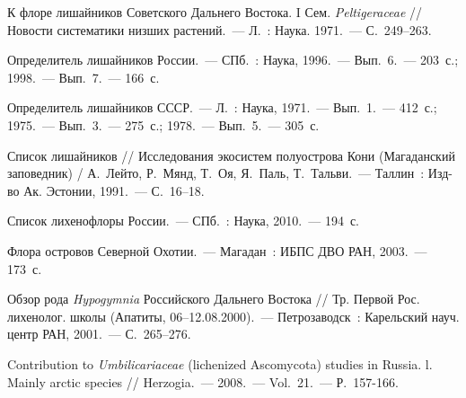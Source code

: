 \begin{thebibliography}{99}
\bibitem{} К флоре лишайников Советского Дальнего Востока. I Сем. \textit{Peltigeraceae} // Новости систематики низших растений.~--- Л.~: Наука. 1971.~--- С.~249--263.

\bibitem{}Определитель лишайников России.~--- СПб.~: Наука, 1996.~--- Вып.~6.~--- 203~с.; 1998.~--- Вып.~7.~--- 166~с.

\bibitem{}Определитель лишайников СССР.~--- Л.~: Наука, 1971.~--- Вып.~1.~--- 412~с.; 1975.~--- Вып.~3.~--- 275~с.; 1978.~--- Вып.~5.~--- 305~с.

\bibitem{} Список лишайников // Исследования экосистем полуострова Кони (Магаданский заповедник) / А.~Лейто, Р.~Мянд, Т.~Оя, Я.~Паль, Т.~Тальви.~--- Таллин~: Изд-во Ак. Эстонии, 1991.~--- С.~16--18.

\bibitem{} Список лихенофлоры России.~--- СПб.~: Наука, 2010.~--- 194~с.

\bibitem{} Флора островов Северной Охотии.~--- Магадан~: ИБПС ДВО РАН, 2003.~--- 173~с.

\bibitem{} Обзор рода \textit{Hypogymnia} Российского Дальнего Востока // Тр. Первой Рос. лихенолог. школы (Апатиты, 06--12.08.2000).~--- Петрозаводск~: Карельский науч. центр РАН, 2001.~--- С.~265--276.

\bibitem{} Contribution to \textit{Umbilicariaceae} (lichenized Ascomycota) studies in Russia. l. Mainly arctic species // Herzogia.~--- 2008.~--- Vol.~21.~--- Р.~157-166.

\end{thebibliography}
